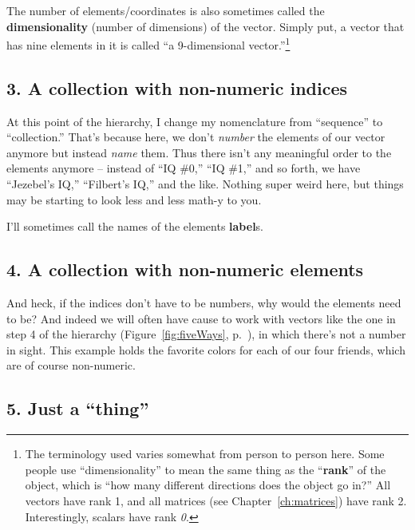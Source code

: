 The number of elements/coordinates is also sometimes called the
\textbf{dimensionality} (number of dimensions) of the vector. Simply put, a
vector that has nine elements in it is called ``a 9-dimensional
vector.''\footnote{The terminology used varies somewhat from person to person
here. Some people use ``dimensionality'' to mean the same thing as the
``\textbf{rank}'' of the object, which is ``how many different directions does
the object go in?'' All vectors have rank 1, and all matrices (see
Chapter~\ref{ch:matrices}) have rank 2. Interestingly, scalars have rank
\textit{0}.}

\subsection{3. A collection with non-numeric indices}

At this point of the hierarchy, I change my nomenclature from ``sequence'' to
``collection.'' That's because here, we don't \textit{number} the elements of
our vector anymore but instead \textit{name} them. Thus there isn't any
meaningful order to the elements anymore -- instead of ``IQ \#0,'' ``IQ \#1,''
and so forth, we have ``Jezebel's IQ,'' ``Filbert's IQ,'' and the like. Nothing
super weird here, but things may be starting to look less and less math-y to
you.


I'll sometimes call the names of the elements \textbf{label}s.


\subsection{4. A collection with non-numeric elements}

And heck, if the indices don't have to be numbers, why would the elements need
to be? And indeed we will often have cause to work with vectors like the one in
step 4 of the hierarchy (Figure~\ref{fig:fiveWays}, p.~\pageref{fig:fiveWays}),
in which there's not a number in sight. This example holds the favorite colors
for each of our four friends, which are of course non-numeric.

\subsection{5. Just a ``thing''}

